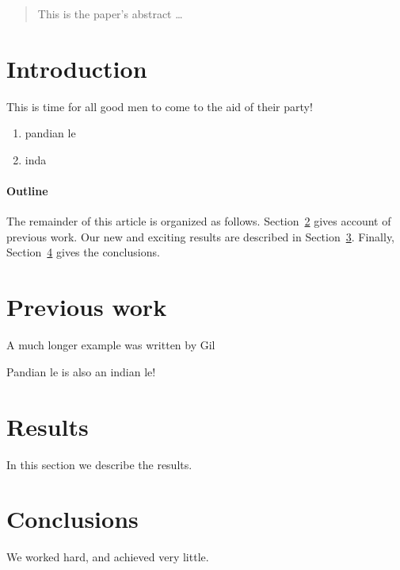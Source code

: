 \documentclass[12pt]{article}
\begin{document}
\maketitle

\begin{abstract}
This is the paper's abstract \ldots
\end{abstract}

\section{Introduction}
This is time for all good men to come to the aid of their party!

\begin{enumerate}
\item pandian le
 \item inda
\end{enumerate}
\paragraph{Outline}

The remainder of this article is organized as follows.
Section~\ref{previous work} gives account of previous work.
Our new and exciting results are described in Section~\ref{results}.
Finally, Section~\ref{conclusions} gives the conclusions.

\section{Previous work}\label{previous work}
A much longer \LaTeXe{} example was written by Gil

Pandian le is also an indian le! 

\section{Results}\label{results}
In this section we describe the results.

\section{Conclusions}\label{conclusions}
We worked hard, and achieved very little.

% 
% 
\end{document}
